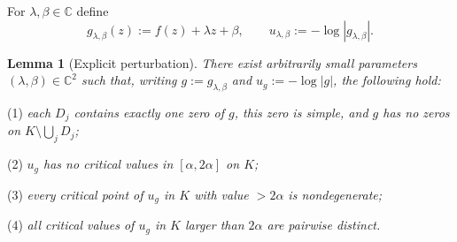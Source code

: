 \documentclass[12pt]{amsart}
\theoremstyle{definition}
\newtheorem{lemma}[theorem]{Lemma}
\theoremstyle{remark}
\begin{document}
For $\lambda,\beta\in\mathbb{C}$ define
\[
 g_{\lambda,\beta}(z):=f(z)+\lambda z+\beta,\qquad u_{\lambda,\beta}:=-\log|g_{\lambda,\beta}|.
\]

\medskip
\begin{lemma}[Explicit perturbation]\label{lem:explicit-perturbation}
\emph{There exist arbitrarily small parameters $(\lambda,\beta)\in\mathbb{C}^2$ such that,
writing $g:=g_{\lambda,\beta}$ and $u_g:=-\log|g|$, the following hold:}

\noindent (1) \emph{each $D_j$ contains exactly one zero of $g$, this zero is simple, and $g$ has no zeros on
$K\setminus \bigcup_j D_j$;}

\noindent (2) \emph{$u_g$ has no critical values in $[\alpha,2\alpha]$ on $K$;}

\noindent (3) \emph{every critical point of $u_g$ in $K$ with value $>2\alpha$ is nondegenerate;}

\noindent (4) \emph{all critical values of $u_g$ in $K$ larger than $2\alpha$ are pairwise distinct.}
\end{lemma}
\end{document}

